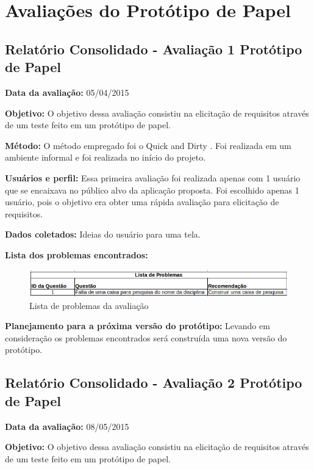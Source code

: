 \chapter{Avaliações do Protótipo de Papel}

\section{Relatório Consolidado - Avaliação 1 Protótipo de Papel}

\textbf{Data da avaliação:} 05/04/2015

\textbf{Objetivo:}
O objetivo dessa avaliação consistiu na elicitação de requisitos através de um teste feito em um protótipo de papel.

\textbf{Método:}
O método empregado foi o Quick and Dirty \cite{preece}. Foi realizada em um ambiente informal e foi realizada no início do projeto.

\textbf{Usuários e perfil:}
Essa primeira avaliação foi realizada apenas com 1 usuário que se encaixava no público alvo da aplicação proposta. Foi escolhido apenas 1 usuário, pois o objetivo era obter uma rápida avaliação para elicitação de requisitos.

\textbf{Dados coletados:}
Ideias do usuário para uma tela.

\textbf{Lista dos problemas encontrados:}
\begin{figure}[h!]
  \centering
    \includegraphics[keepaspectratio=true, scale=0.7]{figuras/problema1.png}
  \caption{Lista de problemas da avaliação}
\end{figure}

\textbf{Planejamento para a próxima versão do protótipo:}
Levando em consideração os problemas encontrados será construída uma nova versão do protótipo. 
\vfill
\pagebreak

\section{Relatório Consolidado - Avaliação 2 Protótipo de Papel}

\textbf{Data da avaliação:} 08/05/2015

\textbf{Objetivo:}
O objetivo dessa avaliação consistiu na elicitação de requisitos através de um teste feito em um protótipo de papel.

